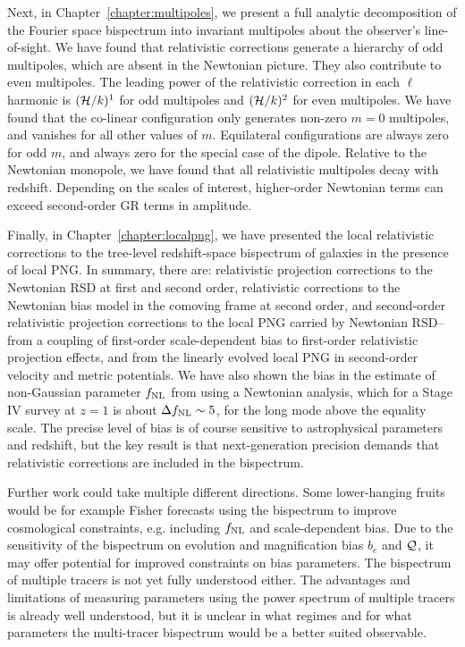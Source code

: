 Next, in Chapter~\ref{chapter:multipoles}, we present a full analytic decomposition of the Fourier space bispectrum into invariant multipoles about the observer's line-of-sight. We have found that relativistic corrections generate a hierarchy of odd multipoles, which are absent in the Newtonian picture. They also contribute to even multipoles. The leading power of the relativistic correction in each $\ell$ harmonic is $(\mathcal{H}/k)^1$ for odd multipoles and $(\mathcal{H}/k)^2$ for even multipoles. We have found that the co-linear configuration only generates non-zero $m = 0$ multipoles, and vanishes for all other values of $m$. Equilateral configurations are always zero for odd $m$, and always zero for the special case of the dipole. Relative to the Newtonian monopole, we have found that all relativistic multipoles decay with redshift. Depending on the scales of interest, higher-order Newtonian terms can exceed second-order GR terms in amplitude. 

Finally, in Chapter~\ref{chapter:localpng}, we have presented the local relativistic corrections to the tree-level redshift-space bispectrum of galaxies in the presence of local PNG. In summary, there are: relativistic projection corrections to the Newtonian RSD at first and second order, relativistic corrections to the Newtonian bias model in the comoving frame at second order, and second-order relativistic projection corrections to the local PNG carried by Newtonian RSD-- from a coupling of first-order scale-dependent bias to first-order relativistic projection effects, and from the linearly evolved local PNG in second-order velocity and metric potentials. We have also shown the bias in the estimate of non-Gaussian parameter $f_\text{NL}$ from using a Newtonian analysis, which for a Stage IV survey at $z = 1$ is about $\Delta f_\text{NL} \sim 5$, for the long mode above the equality scale. The precise level of bias is of course sensitive to astrophysical parameters and redshift, but the key result is that next-generation precision demands that relativistic corrections are included in the bispectrum. 

Further work could take multiple different directions. Some lower-hanging fruits would be for example Fisher forecasts using the bispectrum to improve cosmological constraints, e.g. including $f_\text{NL}$ and scale-dependent bias. Due to the sensitivity of the bispectrum on evolution and magnification bias $b_e$ and $\mathcal{Q}$, it may offer potential for improved constraints on bias parameters. The bispectrum of multiple tracers is not yet fully understood either. The advantages and limitations of measuring parameters using the power spectrum of multiple tracers is already well understood, but it is unclear in what regimes and for what parameters the multi-tracer bispectrum would be a better suited observable. 

